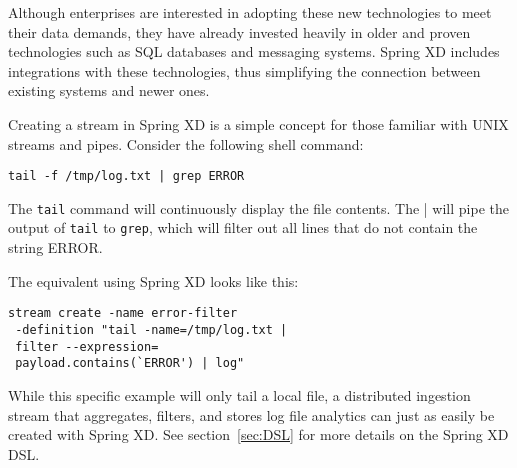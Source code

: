 Although enterprises are interested in adopting these new technologies to
meet their data demands, they have already invested heavily in older and proven
technologies such as SQL databases and messaging systems. Spring XD includes
integrations with these technologies, thus simplifying the connection between
existing systems and newer ones.

Creating a stream in Spring XD is a simple concept for those familiar with
UNIX streams and pipes. Consider the following shell command:

\begin{lstlisting}
tail -f /tmp/log.txt | grep ERROR
\end{lstlisting}

The \texttt{tail} command will continuously display the file contents. The |
will pipe the output of \texttt{tail} to \texttt{grep}, which will filter 
out all lines that do not contain the string ERROR.

The equivalent using Spring XD looks like this:

\begin{lstlisting}
stream create -name error-filter
 -definition "tail -name=/tmp/log.txt |
 filter --expression=
 payload.contains(`ERROR') | log"
\end{lstlisting}

While this specific example will only tail a local file, a distributed 
ingestion stream that aggregates, filters, and stores log file analytics
can just as easily be created with Spring XD. See section~\ref{sec:DSL} for more
details on the Spring XD DSL.
